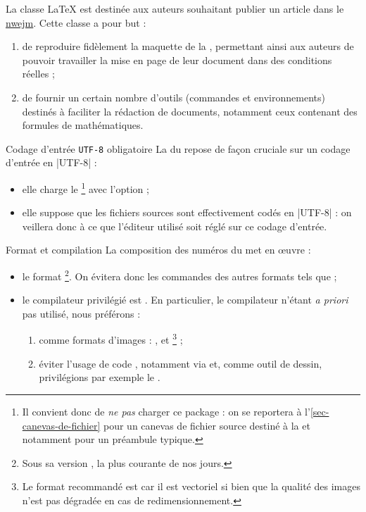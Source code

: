 \documentclass[english,nolocaltoc]{nwejmart}
\newtheorem[style=definition]{fait}
\newtheorem[title=expérience]{experience}
\newtheorem[title-plural=anneaux]{anneau}
\newtheorem[title=idéal,title-plural=idéaux]{ideal}
\begin{document}
La classe \LaTeX{} \nwejmauthor{} est destinée aux auteurs souhaitant publier un
article dans le \href{http://math.univ-lille1.fr/~nwejm/}{\gls{nwejm}}. Cette
classe a pour but :
\begin{enumerate}
\item de reproduire fidèlement la maquette de la \nwejm{}, permettant ainsi
  aux auteurs de pouvoir travailler la mise en page de leur document dans des
  conditions réelles ;
\item de fournir un certain nombre d'outils (commandes et environnements)
  destinés à faciliter la rédaction de documents, notamment ceux contenant des
  formules de mathématiques.
\end{enumerate}

\begin{dbwarning}{Codage d'entrée \protect\lstinline+UTF-8+ obligatoire}{}
  La \nwejmauthorcl{} du \nwejm{} repose de façon cruciale sur un codage
  d'entrée en |UTF-8| :
  \begin{itemize}
  \item elle charge le \footnote{%
      Il convient donc de \emph{ne pas} charger ce package : on se reportera
      à l'\vref{sec-canevas-de-fichier} pour un canevas de fichier source
      destiné à la \nwejm{} et notamment pour un préambule typique.%
    }
    avec l'option  ;
  \item elle suppose que les fichiers sources  sont effectivement
    codés en |UTF-8| : on veillera donc à ce que l'éditeur utilisé soit réglé
    sur ce codage d'entrée.
  \end{itemize}
\end{dbwarning}

\begin{dbwarning}{Format et compilation }{}
  La composition des numéros du \nwejm*{} met en œuvre :
  \begin{itemize}
  \item le format \footnote{Sous sa version , la
      plus courante de nos jours.}. On évitera donc les commandes des autres
    formats tels que  ;
  \item le compilateur privilégié est . En particulier, le
    compilateur  n'étant \emph{a priori} pas utilisé, nous
    préférons :
    \begin{enumerate}
    \item comme formats d'images : ,  et
      \footnote{Le format recommandé est  car il est
        vectoriel si bien que la qualité des images n'est pas dégradée en cas de
        redimensionnement.} ;
    \item éviter l'usage de code , notamment via
       et, comme outil de dessin, privilégions par exemple le
      .
    \end{enumerate}
  \end{itemize}
\end{dbwarning}
\end{document}
